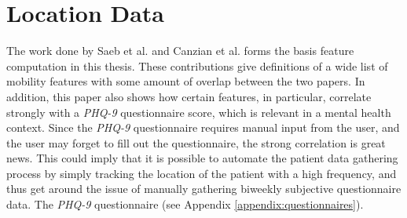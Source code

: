 \section{Location Data}



The work done by Saeb et al. \cite{Saeb2015} and Canzian et al. \cite{Canzian2015} forms the basis feature computation in this thesis. These contributions give definitions of a wide list of mobility features with some amount of overlap between the two papers. In addition, this paper also shows how certain features, in particular, correlate strongly with a \textit{PHQ-9} questionnaire score, which is relevant in a mental health context. Since the \textit{PHQ-9} questionnaire requires manual input from the user, and the user may forget to fill out the questionnaire, the strong correlation is great news. This could imply that it is possible to automate the patient data gathering process by simply tracking the location of the patient with a high frequency, and thus get around the issue of manually gathering biweekly subjective questionnaire data. The \textit{PHQ-9} questionnaire (see Appendix \ref{appendix:questionnaires}).

